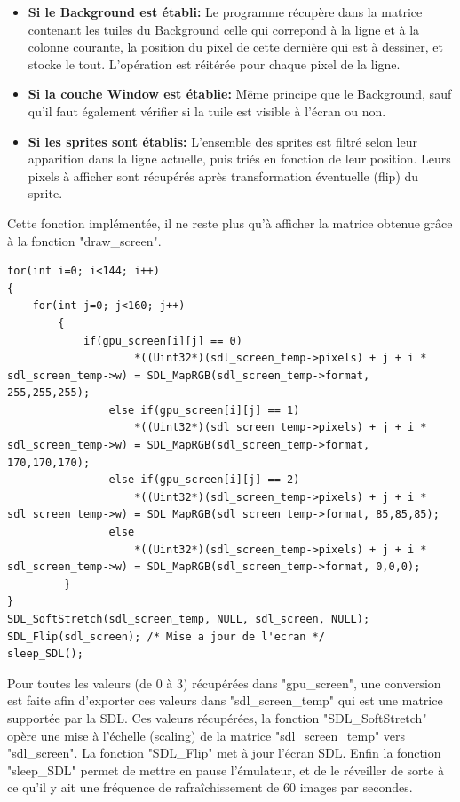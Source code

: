 \documentclass{report}
\begin{document}
\begin{itemize}
\item \textbf{Si le Background est établi:}
	Le programme récupère dans la matrice contenant les tuiles du Background celle qui correpond à la ligne et à la colonne courante, la position du pixel de cette dernière qui est à dessiner, et stocke le tout. L'opération est réitérée pour chaque pixel de la ligne.
\item \textbf{Si la couche Window est établie:}
	Même principe que le Background, sauf qu'il faut également vérifier si la tuile est visible à l'écran ou non.
\item \textbf{Si les sprites sont établis:}
	L'ensemble des sprites est filtré selon leur apparition dans la ligne actuelle, puis triés en fonction de leur position. 
	Leurs pixels à afficher sont récupérés après transformation éventuelle (flip) du sprite.
\end{itemize}
Cette fonction implémentée, il ne reste plus qu'à afficher la matrice obtenue grâce à la fonction "draw\_screen". 

\begin{lstlisting}
for(int i=0; i<144; i++)
{
	for(int j=0; j<160; j++)
        {
        	if(gpu_screen[i][j] == 0)
                	*((Uint32*)(sdl_screen_temp->pixels) + j + i * sdl_screen_temp->w) = SDL_MapRGB(sdl_screen_temp->format, 255,255,255);
                else if(gpu_screen[i][j] == 1)
                	*((Uint32*)(sdl_screen_temp->pixels) + j + i * sdl_screen_temp->w) = SDL_MapRGB(sdl_screen_temp->format, 170,170,170);
                else if(gpu_screen[i][j] == 2)
                	*((Uint32*)(sdl_screen_temp->pixels) + j + i * sdl_screen_temp->w) = SDL_MapRGB(sdl_screen_temp->format, 85,85,85);
                else
                	*((Uint32*)(sdl_screen_temp->pixels) + j + i * sdl_screen_temp->w) = SDL_MapRGB(sdl_screen_temp->format, 0,0,0);
         }
}
SDL_SoftStretch(sdl_screen_temp, NULL, sdl_screen, NULL);
SDL_Flip(sdl_screen); /* Mise a jour de l'ecran */
sleep_SDL();
\end{lstlisting}
Pour toutes les valeurs (de 0 à 3) récupérées dans "gpu\_screen", une conversion est faite afin d'exporter ces valeurs dans "sdl\_screen\_temp" qui est une matrice supportée par la SDL. Ces valeurs récupérées, la fonction "SDL\_SoftStretch" opère une mise à l'échelle (scaling) de la matrice "sdl\_screen\_temp" vers "sdl\_screen". La fonction "SDL\_Flip" met à jour l'écran SDL. Enfin la fonction "sleep\_SDL" permet de mettre en pause l'émulateur, et de le réveiller de sorte à ce qu'il y ait une fréquence de rafraîchissement de 60 images par secondes.
\end{document}
